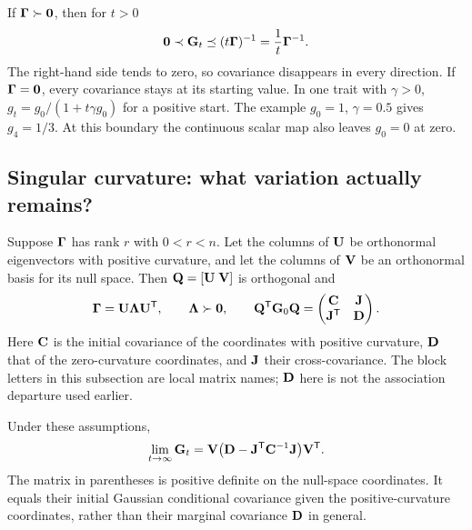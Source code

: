If $\boldsymbol{\Gamma}\succ\mathbf{0}$, then for $t>0$
\begin{equation}
  \mathbf{0}\prec\mathbf{G}_t\preceq(t\boldsymbol{\Gamma})^{-1}
                     =\frac1t\boldsymbol{\Gamma}^{-1}.
  \label{inheritance:positive-curvature-limit}
\end{equation}
The right-hand side tends to zero, so covariance disappears in every
direction. If $\boldsymbol{\Gamma}=\mathbf{0}$, every covariance stays at its starting
value. In one trait with $\gamma>0$,
$g_t=g_0/(1+t\gamma g_0)$ for a positive start. The example
$g_0=1$, $\gamma=0.5$ gives $g_4=1/3$. At this boundary the continuous
scalar map also leaves $g_0=0$ at zero.

\subsection{Singular curvature: what variation actually remains?}
\label{inheritance:singular-limit}

Suppose $\boldsymbol{\Gamma}$ has rank $r$ with $0<r<n$. Let the columns of
$\mathbf{U}$ be orthonormal eigenvectors with positive curvature, and
let the columns of $\mathbf{V}$ be an orthonormal basis for its null space.
Then $\mathbf{Q}=[\mathbf{U}\;\mathbf{V}]$ is orthogonal and
\begin{equation}
  \boldsymbol{\Gamma}=\mathbf{U}\mathbf{\Lambda}\mathbf{U}^{\mathsf T},
  \qquad \mathbf{\Lambda}\succ\mathbf{0},
  \qquad
  \mathbf{Q}^{\mathsf T}\mathbf{G}_0\mathbf{Q}
     =\begin{pmatrix}\mathbf{C}&\mathbf{J}\\\mathbf{J}^{\mathsf T}&\mathbf{D}\end{pmatrix}.
  \label{inheritance:curvature-blocks}
\end{equation}
Here $\mathbf{C}$ is the initial covariance of the coordinates with positive
curvature, $\mathbf{D}$ that of the zero-curvature coordinates, and $\mathbf{J}$
their cross-covariance. The block letters in this subsection are local
matrix names; $\mathbf{D}$ here is not the association departure used earlier.

\begin{proposition}
  \label{inheritance:schur-limit}
  Under these assumptions,
  \begin{equation}
    \lim_{t\to\infty}\mathbf{G}_t
       =\mathbf{V}\bigl(\mathbf{D}-\mathbf{J}^{\mathsf T}\mathbf{C}^{-1}\mathbf{J}\bigr)
                        \mathbf{V}^{\mathsf T}.
    \label{inheritance:null-limit}
  \end{equation}
  The matrix in parentheses is positive definite on the null-space
  coordinates. It equals their initial Gaussian conditional covariance
  given the positive-curvature coordinates, rather than their marginal
  covariance $\mathbf{D}$ in general.
\end{proposition}

